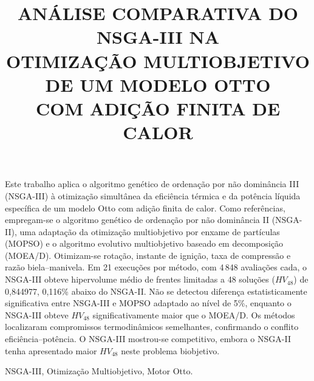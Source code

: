 \documentclass[a4paper,11pt]{article}
\begin{document}
\title{ANÁLISE COMPARATIVA DO NSGA-III NA\\
OTIMIZAÇÃO MULTIOBJETIVO DE UM MODELO OTTO\\
COM ADIÇÃO FINITA DE CALOR}

\maketitle
\thispagestyle{fancy}

\author{
}

\author{
}

\vspace{2mm}
\begin{resumo}
Este trabalho aplica o algoritmo genético de ordenação por não dominância III
(NSGA-III) à otimização simultânea da eficiência térmica e da potência líquida
específica de um modelo Otto com adição finita de calor. Como referências,
empregam-se o algoritmo genético de ordenação por não dominância II (NSGA-II),
uma adaptação da otimização multiobjetivo por enxame de partículas (MOPSO) e o
algoritmo evolutivo multiobjetivo baseado em decomposição (MOEA/D). Otimizam-se
rotação, instante de ignição, taxa de compressão e razão biela--manivela. Em 21
execuções por método, com 4\,848 avaliações cada, o NSGA-III obteve
hipervolume médio de frentes limitadas a 48 soluções ($HV_{48}$) de 0,844977,
0,116\% abaixo do NSGA-II. Não se detectou diferença estatisticamente
significativa entre NSGA-III e MOPSO adaptado ao nível de 5\%, enquanto o
NSGA-III obteve $HV_{48}$ significativamente maior que o MOEA/D. Os métodos
localizaram compromissos termodinâmicos semelhantes, confirmando o conflito
eficiência--potência. O NSGA-III mostrou-se competitivo, embora o NSGA-II tenha
apresentado maior $HV_{48}$ neste problema biobjetivo.
\end{resumo}

\smallskip
\begin{palchaves}
NSGA-III, Otimização Multiobjetivo, Motor Otto.

\smallskip
{}
\end{palchaves}
\end{document}
